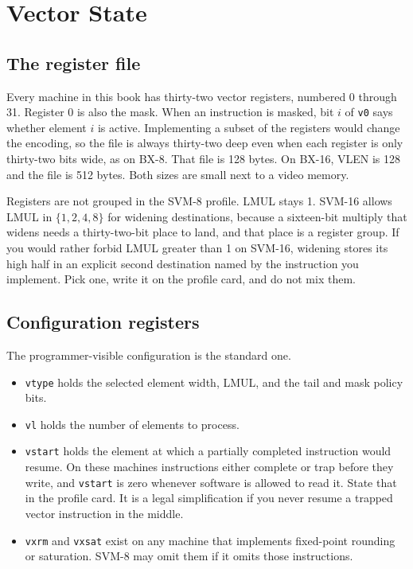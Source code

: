 \chapter{Vector State}
\label{ch:state}

\section{The register file}

Every machine in this book has thirty-two vector registers, numbered 0 through 31. Register 0 is also the mask. When an instruction is masked, bit $i$ of \texttt{v0} says whether element $i$ is active. Implementing a subset of the registers would change the encoding, so the file is always thirty-two deep even when each register is only thirty-two bits wide, as on BX-8. That file is 128 bytes. On BX-16, VLEN is 128 and the file is 512 bytes. Both sizes are small next to a video memory.

Registers are not grouped in the SVM-8 profile. LMUL stays 1. SVM-16 allows LMUL in $\{1,2,4,8\}$ for widening destinations, because a sixteen-bit multiply that widens needs a thirty-two-bit place to land, and that place is a register group. If you would rather forbid LMUL greater than 1 on SVM-16, widening stores its high half in an explicit second destination named by the instruction you implement. Pick one, write it on the profile card, and do not mix them.

\section{Configuration registers}

The programmer-visible configuration is the standard one.

\begin{itemize}[leftmargin=1.5em]
  \item \texttt{vtype} holds the selected element width, LMUL, and the tail and mask policy bits.
  \item \texttt{vl} holds the number of elements to process.
  \item \texttt{vstart} holds the element at which a partially completed instruction would resume. On these machines instructions either complete or trap before they write, and \texttt{vstart} is zero whenever software is allowed to read it. State that in the profile card. It is a legal simplification if you never resume a trapped vector instruction in the middle.
  \item \texttt{vxrm} and \texttt{vxsat} exist on any machine that implements fixed-point rounding or saturation. SVM-8 may omit them if it omits those instructions.
\end{itemize}

